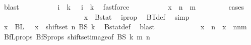 \begin{isabellebody}
\ blast\isanewline
\ \ \ \ \ \ \ \isamarkupfalse%
\ \isamarkupfalse%
\ {\isachardoublequoteopen}i\ {\isacharequal}{\kern0pt}\ k\ {\isacharplus}{\kern0pt}{}{\isachardoublequoteclose}\ {\isacharbar}{\kern0pt}\ {\isachardoublequoteopen}i\ {\isasymin}\ {\isacharbraceleft}{\kern0pt}{\isachardot}{\kern0pt}{\isachardot}{\kern0pt}{\isacharless}{\kern0pt}k{\isacharplus}{\kern0pt}{}{\isacharbraceright}{\kern0pt}{\isachardoublequoteclose}\ \isamarkupfalse%
\ fastforce\isanewline
\ \ \ \ \ \ \ \isamarkupfalse%
\ \isamarkupfalse%
\ {\isachardoublequoteopen}x\ {\isasymin}\ {\isacharbraceleft}{\kern0pt}{\isachardot}{\kern0pt}{\isachardot}{\kern0pt}{\isacharless}{\kern0pt}n\ {\isacharplus}{\kern0pt}\ m{\isacharbraceright}{\kern0pt}{\isachardoublequoteclose}\isanewline
\ \ \ \ \ \ \ \isamarkupfalse%
\ {\isacharparenleft}{\kern0pt}cases{\isacharparenright}{\kern0pt}\isanewline
\ \ \ \ \ \ \ \ \ \isamarkupfalse%
\ {}\isanewline
\ \ \ \ \ \ \ \ \ \isamarkupfalse%
\ \isamarkupfalse%
\ {\isachardoublequoteopen}x\ {\isasymin}\ Bstat{\isachardoublequoteclose}\ \isamarkupfalse%
\ i{\isacharunderscore}{\kern0pt}prop\ \isamarkupfalse%
\ BT{\isacharunderscore}{\kern0pt}def\ \isamarkupfalse%
\ simp\isanewline
\ \ \ \ \ \ \ \ \ \isamarkupfalse%
\ \isamarkupfalse%
\ {\isachardoublequoteopen}x\ {\isasymin}\ BL\ {}\ {\isasymor}\ x\ {\isasymin}\ shiftset\ n\ {\isacharparenleft}{\kern0pt}BS\ k{\isacharparenright}{\kern0pt}{\isachardoublequoteclose}\ \isamarkupfalse%
\ Bstat{\isacharunderscore}{\kern0pt}def\ \isamarkupfalse%
\ blast\isanewline
\ \ \ \ \ \ \ \ \ \isamarkupfalse%
\ \isamarkupfalse%
\ {\isachardoublequoteopen}x\ {\isasymin}\ {\isacharbraceleft}{\kern0pt}{\isachardot}{\kern0pt}{\isachardot}{\kern0pt}{\isacharless}{\kern0pt}n{\isacharbraceright}{\kern0pt}\ {\isasymor}\ x\ {\isasymin}\ {\isacharbraceleft}{\kern0pt}n{\isachardot}{\kern0pt}{\isachardot}{\kern0pt}{\isacharless}{\kern0pt}n{\isacharplus}{\kern0pt}m{\isacharbraceright}{\kern0pt}{\isachardoublequoteclose}\ \isamarkupfalse%
\ BfL{\isacharunderscore}{\kern0pt}props\ BfS{\isacharunderscore}{\kern0pt}props{\isacharparenleft}{\kern0pt}{}{\isacharparenright}{\kern0pt}\ shiftset{\isacharunderscore}{\kern0pt}image{\isacharbrackleft}{\kern0pt}of\ BS\ k\ m\ n{\isacharbrackright}{\kern0pt}\ \isamarkupfalse%

\end{isabellebody}
